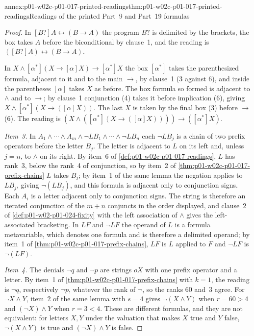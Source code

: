 \begin{annexitem}{annex:p01-w02c-p01-017-printed-readings}{thm:p01-w02c-p01-017-printed-readings}{Readings of the printed Part~9 and Part~19 formulas}
\begin{proof}
In \([B?]A\leftrightarrow(B\to A)\) the program \(B?\) is delimited by the
brackets, the box takes \(A\) before the biconditional by clause~1, and
the reading is \(([B?]A)\leftrightarrow(B\to A)\).

In \(X\land[\alpha^{*}](X\to[\alpha]X)\to[\alpha^{*}]X\) the box
\([\alpha^{*}]\) takes the parenthesized formula, adjacent to it and to
the main \(\to\), by clause~1 (3 against 6), and inside the parentheses
\([\alpha]\) takes \(X\) as before.  The box formula so formed is adjacent
to \(\land\) and to \(\to\); by clause~1 conjunction (4) takes it before
implication (6), giving \(X\land[\alpha^{*}](X\to([\alpha]X))\).  The last
\(X\) is taken by the final box (3) before \(\to\) (6).  The reading is
\((X\land([\alpha^{*}](X\to([\alpha]X))))\to([\alpha^{*}]X)\).

\emph{Item~3.}  In
\(A_1\land\cdots\land A_m\land\neg LB_1\land\cdots\land\neg LB_n\) each
\(\neg LB_j\) is a chain of two prefix operators before the letter
\(B_j\).  The letter is adjacent to \(L\) on its left and, unless \(j=n\),
to \(\land\) on its right.  By item~6 of
\cref{def:p01-w02c-p01-017-readings}, \(L\) has rank~3, below the rank~4
of conjunction, so by item~2 of
\cref{thm:p01-w02c-p01-017-prefix-chains} \(L\) takes \(B_j\); by item~1
of the same lemma the negation applies to \(LB_j\), giving
\(\neg(LB_j)\), and this formula is adjacent only to conjunction signs.
Each \(A_i\) is a letter adjacent only to conjunction signs.  The string
is therefore an iterated conjunction of the \(m+n\) conjuncts in the
order displayed, and clause~2 of \cref{def:p01-w02-p01-024-fixity} with
the left association of \(\land\) gives the left-associated bracketing.
In \(LF\) and \(\neg LF\) the operand of \(L\) is a formula metavariable,
which denotes one formula and is therefore a delimited operand; by item~1
of \cref{thm:p01-w02c-p01-017-prefix-chains}, \(LF\) is \(L\) applied to
\(F\) and \(\neg LF\) is \(\neg(LF)\).

\emph{Item~4.}  The denials \(\neg q\) and \(\neg p\) are strings
\(oX\) with one prefix operator and a letter.  By item~1 of
\cref{thm:p01-w02c-p01-017-prefix-chains} with \(k=1\), the reading is
\(\neg q\), respectively \(\neg p\), whatever the rank of \(\neg\), so the
ranks 60 and~3 agree.  For \(\neg X\land Y\), item~2 of the same lemma
with \(s=4\) gives \(\neg(X\land Y)\) when \(r=60>4\) and
\((\neg X)\land Y\) when \(r=3<4\).  These are different formulas, and
they are not equivalent: for letters \(X,Y\) under the valuation that
makes \(X\) true and \(Y\) false, \(\neg(X\land Y)\) is true and
\((\neg X)\land Y\) is false.


\end{proof}
\end{annexitem}
